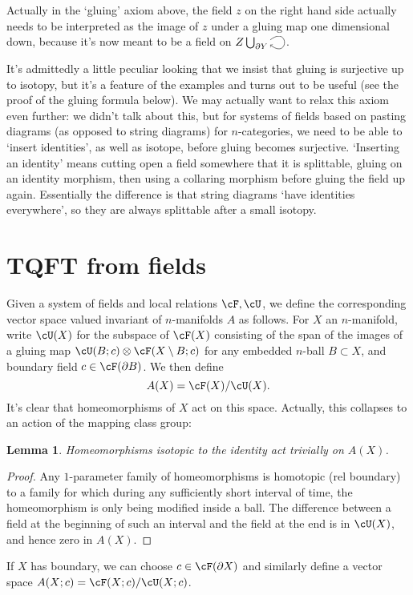 \documentclass[11pt]{amsart}
\theoremstyle{plain}
\newtheorem{lem}[prop]{Lemma}
\newcommand{\selfarrow}{\ensuremath{\smash{\tikz[baseline]{\clip (0,0.36) rectangle (0.48,-0.16); \draw[->] (0,0.175) .. controls (0.6,0.65) and (0.6,-0.45) .. (0,0.025);}}}}
\newcommand{\bdy}{\partial}
\newcommand{\tensor}{\otimes}
\begin{document}
Actually in the `gluing' axiom above, the field $z$ on the right hand side actually needs to be interpreted as the image of $z$ under a gluing map one dimensional down, because it's now meant to be a field on $Z \bigcup_{\bdy Y} \selfarrow$.

It's admittedly a little peculiar looking that we insist that gluing is surjective up to isotopy, but it's a feature of the examples and turns out to be useful (see the proof of the gluing formula below). We may actually want to relax this axiom even further: we didn't talk about this, but for systems of fields based on pasting diagrams (as opposed to string diagrams) for $n$-categories, we need to be able to `insert identities', as well as isotope, before gluing becomes surjective. `Inserting an identity' means cutting open a field somewhere that it is splittable, gluing on an identity morphism, then using a collaring morphism before gluing the field up again. Essentially the difference is that string diagrams `have identities everywhere', so they are always splittable after a small isotopy.

\section{TQFT from fields}
Given a system of fields and local relations $\cF, \cU$, we define the corresponding vector space valued invariant of $n$-manifolds $A$ as follows. For $X$ an $n$-manifold, write $\cU(X)$ for the subspace of $\cF(X)$ consisting of the span of the images of a gluing map $\cU(B; c) \tensor \cF(X \setminus B; c)$ for any embedded $n$-ball $B \subset X$, and boundary field $c \in \cF(\bdy B)$. We then define
$$A(X) = \cF(X) / \cU(X).$$
It's clear that homeomorphisms of $X$ act on this space. Actually, this collapses to an action of the mapping class group:
\begin{lem}
Homeomorphisms isotopic to the identity act trivially on $A(X)$.
\end{lem}
\begin{proof}
Any $1$-parameter family of homeomorphisms is homotopic (rel boundary) to a family for which during any sufficiently short interval of time, the homeomorphism is only being modified inside a ball. The difference between a field at the beginning of such an interval and the field at the end is in $\cU(X)$, and hence zero in $A(X)$.
\end{proof}


If $X$ has boundary, we can choose $c \in \cF(\bdy X)$ and similarly define a vector space $A(X; c) = \cF(X; c) / \cU(X; c)$.
\end{document}
